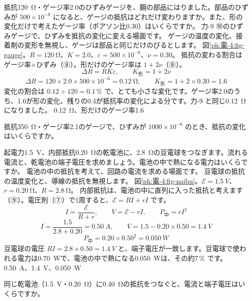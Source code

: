 \label{ph:電-4:ex8}
\begin{phreidai}[ひずみゲージの抵抗の変化]
抵抗\qty{120}{\ohm}・ゲージ率2.0のひずみゲージを、鋼の部品にはりました。部品のひずみが $500\times10^{-6}$ になると、ゲージの抵抗はどれだけ変わりますか。また、形の変化だけで考えたゲージ率（ポアソン比0.30）はいくらですか。
\phbamen
力-9 ⑩のひずみゲージで、ひずみを抵抗の変化に変える場面です。
\phmushi
ゲージの温度の変化、接着剤の変形を無視し、ゲージは部品と同じだけのびるとします。
\phzu
図\ref{ph:電-4:fig-gauge}。$R=\qty{120}{\ohm}$、$K=2.0$、$\varepsilon=500\times10^{-6}$、$\nu=0.30$。
\phriyu
抵抗の変わる割合はゲージ率×ひずみ（⑧）。形だけのゲージ率は $1+2\nu$（⑧）。
\phtateru
\[\Delta R=RK\varepsilon,\qquad K_{\text{形}}=1+2\nu\]
\phtoku
\[\Delta R=120\times2.0\times500\times10^{-6}=\qty{0.12}{\ohm},\qquad K_{\text{形}}=1+2\times0.30=1.6\]
\phtashikame
変化の割合は $0.12\div120=0.1$\,\% で、とても小さな変化です。ゲージ率2.0のうち、1.6が形の変化、残りの0.4が抵抗率の変化による分です。力-9 と同じ\qty{0.12}{\ohm}になりました。
\kotae \qty{0.12}{\ohm}、形だけのゲージ率1.6
\end{phreidai}
\begin{jibun}
抵抗\qty{350}{\ohm}・ゲージ率2.1のゲージで、ひずみが $1000\times10^{-6}$ のとき、抵抗の変化はいくらですか。
\end{jibun}

\label{ph:電-4:ex9}
\begin{phreidai}[乾電池の端子電圧]
起電力\qty{1.5}{V}、内部抵抗\qty{0.20}{\ohm}の乾電池に、\qty{2.8}{\ohm}の豆電球をつなぎます。流れる電流と、乾電池の端子電圧を求めましょう。電池の中で熱になる電力はいくらですか。
\phbamen
電池の中の抵抗を考えて、回路の電流を求める場面です。
\phmushi
豆電球の抵抗の温度変化と、導線の抵抗を無視します。
\phzu
図\ref{ph:電-4:fig-naibu}。$\mathcal E=\qty{1.5}{V}$、$r=\qty{0.20}{\ohm}$、$R=\qty{2.8}{\ohm}$。
\phriyu
内部抵抗は、電池の中に直列に入った抵抗と考えます（⑨）。電圧則（⑦）で1周すると、$\mathcal E=RI+rI$ です。
\phtateru
\[I=\frac{\mathcal E}{R+r},\qquad V=\mathcal E-rI,\qquad P_{\text{中}}=rI^2\]
\phtoku
\[I=\frac{1.5}{2.8+0.20}=\qty{0.50}{A},\qquad V=1.5-0.20\times0.50=\qty{1.4}{V}\]
\[P_{\text{中}}=0.20\times0.50^2=\qty{0.050}{W}\]
\phtashikame
豆電球の電圧 $RI=2.8\times0.50=\qty{1.4}{V}$ と、端子電圧が一致します。豆電球で使われる電力は\qty{0.70}{W}で、電池の中で熱になる\qty{0.050}{W}は、その約7\,\% です。
\kotae \qty{0.50}{A}、\qty{1.4}{V}、\qty{0.050}{W}
\end{phreidai}
\begin{jibun}
同じ乾電池（\qty{1.5}{V}・\qty{0.20}{\ohm}）に\qty{0.40}{\ohm}の抵抗をつなぐと、電流と端子電圧はいくらですか。
\end{jibun}

